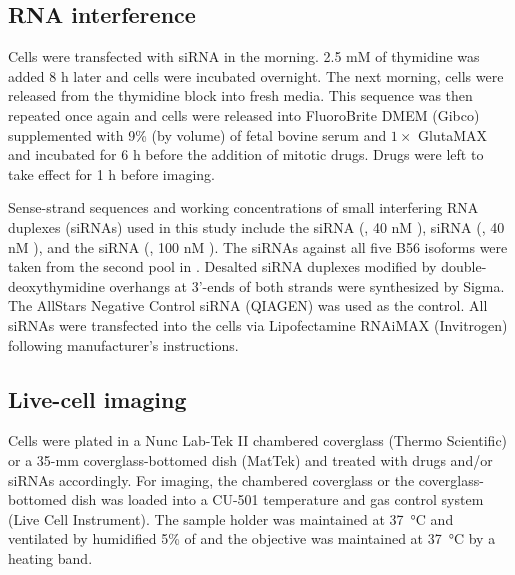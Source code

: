 \subsection{RNA interference}
Cells were transfected with siRNA in the morning. 2.5 mM of thymidine was added 8 h later and cells were incubated overnight. The next morning, cells were released from the thymidine block into fresh media. This sequence was then repeated once again and cells were released into FluoroBrite\texttrademark{} DMEM (Gibco) supplemented with 9\% (by volume) of fetal bovine serum and $1\times$ GlutaMAX and incubated for 6 h before the addition of mitotic drugs. Drugs were left to take effect for 1 h before imaging.

Sense-strand sequences and working concentrations of small interfering RNA duplexes (siRNAs) used in this study include the  siRNA (, 40 nM \cite{siBUBR1}),  siRNA (, 40 nM \cite{BUB1-si5}), and the  siRNA (, 100 nM \cite{siZW10}). The siRNAs against all five B56 isoforms were taken from the second pool in \cite{siB56s}.
Desalted siRNA duplexes modified by double-deoxythymidine overhangs at 3'-ends of both strands were synthesized by Sigma. The AllStars Negative Control siRNA (QIAGEN) was used as the control. All siRNAs were transfected into the cells via Lipofectamine RNAiMAX (Invitrogen) following manufacturer’s instructions.

\subsection{Live-cell imaging}
Cells were plated in a Nunc Lab-Tek II chambered coverglass (Thermo Scientific) or a 35-mm coverglass-bottomed dish (MatTek) and treated with drugs and/or siRNAs accordingly. For imaging, the chambered coverglass or the coverglass-bottomed dish was loaded into a CU-501 temperature and gas control system (Live Cell Instrument). The sample holder was maintained at \SI{37}{\celsius} and ventilated by humidified 5\% of  and the objective was maintained at \SI{37}{\celsius} by a heating band.

